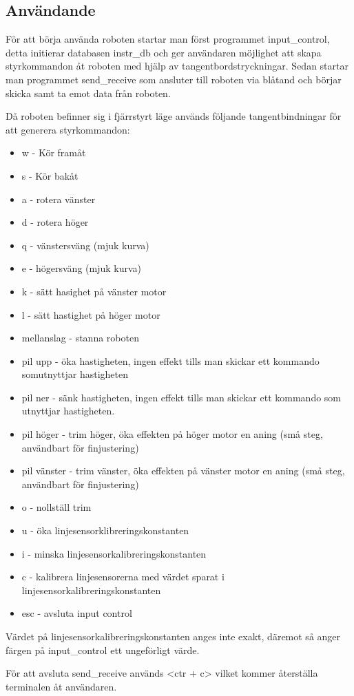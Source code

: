 \subsection{Användande} 

För att börja använda roboten startar man först programmet input\_control, detta
initierar databasen instr\_db och ger användaren möjlighet att skapa
styrkommandon åt roboten med hjälp av tangentbordstryckningar. Sedan startar man
programmet send\_receive som ansluter till roboten via blåtand och börjar skicka
samt ta emot data från roboten.

Då roboten befinner sig i fjärrstyrt läge används följande tangentbindningar för
att generera styrkommandon: 
\begin{itemize}
\item w - Kör framåt
\item s - Kör bakåt
\item a - rotera vänster
\item d - rotera höger
\item q - vänstersväng (mjuk kurva)
\item e - högersväng (mjuk kurva)
\item k - sätt hasighet på vänster motor
\item l - sätt hastighet på höger motor
\item mellanslag - stanna roboten
\item pil upp - öka hastigheten, ingen effekt tills man skickar ett kommando somutnyttjar hastigheten
\item pil ner - sänk hastigheten, ingen effekt tills man skickar ett kommando som utnyttjar hastigheten.
\item pil höger - trim höger, öka effekten på höger motor en aning (små steg, användbart för finjustering)
\item pil vänster - trim vänster, öka effekten på vänster motor en aning (små steg, användbart för finjustering)
\item o - nollställ trim
\item u - öka linjesensorklibreringskonstanten 
\item i - minska linjesensorkalibreringskonstanten
\item c - kalibrera linjesensorerna med värdet sparat i
linjesensorkalibreringskonstanten
\item esc - avsluta input control
\end{itemize}

Värdet på linjesensorkalibreringskonstanten anges inte exakt, däremot så anger
färgen på input\_control ett ungeförligt värde.

För att avsluta send\_receive används <ctr + c> vilket kommer återställa
terminalen åt användaren.
